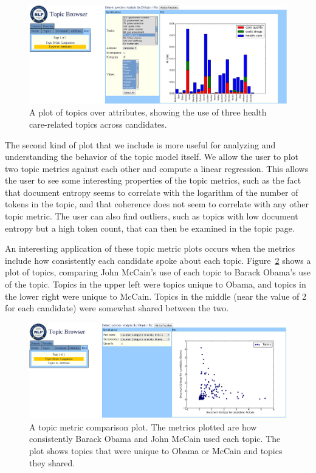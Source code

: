 \documentclass{article}
\begin{document}
\begin{figure}
  \centering
  \includegraphics[width=\textwidth]{trend_plot}
  \caption{A plot of topics over attributes, showing the use of three health
  care-related topics across candidates.}
  \label{fig:trend-plot}
\end{figure}

The second kind of plot that we include is more useful for analyzing and
understanding the behavior of the topic model itself.  We allow the user to
plot two topic metrics against each other and compute a linear regression.
This allows the user to see some interesting properties of the topic metrics,
such as the fact that document entropy seems to correlate with the logarithm of
the number of tokens in the topic, and that coherence does not seem to
correlate with any other topic metric.  The user can also find outliers, such
as topics with low document entropy but a high token count, that can then be
examined in the topic page.

An interesting application of these topic metric plots occurs when the metrics
include how consistently each candidate spoke about each topic.
Figure~\ref{fig:metric-plot} shows a plot of topics, comparing John McCain's
use of each topic to Barack Obama's use of the topic.  Topics in the upper left
were topics unique to Obama, and topics in the lower right were unique to
McCain.  Topics in the middle (near the value of 2 for each candidate) were
somewhat shared between the two.

\begin{figure}
  \centering
  \includegraphics[width=\textwidth]{metric_plot}
  \caption{A topic metric comparison plot.  The metrics plotted are how
  consistently Barack Obama and John McCain used each topic. The plot shows
  topics that were unique to Obama or McCain and topics they shared.}
  \label{fig:metric-plot}
\end{figure}
\end{document}
